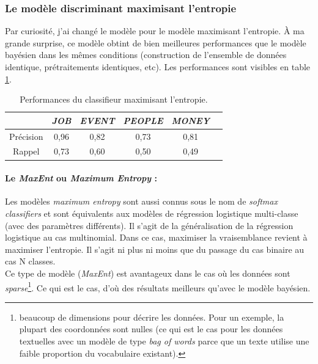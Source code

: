             \subsubsection{Le modèle discriminant maximisant l'entropie}
                Par curiosité, j'ai changé le modèle pour le modèle maximisant l'entropie. À ma grande surprise, ce modèle obtint de bien meilleures performances que le modèle bayésien dans les mêmes conditions (construction de l'ensemble de données identique, prétraitements identiques, etc). Les performances sont visibles en table \ref{tab:classif_perf3}.
                \begin{table}[h]
                    \centering
                    \begin{tabular}{| c | c | c | c | c | c |}
                        \hline
                         & \textit{JOB} & \textit{EVENT} & \textit{PEOPLE} & \textit{MONEY} \\
                        \hline
                        Précision & 0,96 & 0,82 & 0,73 & 0,81 \\
                        Rappel & 0,73 & 0,60 & 0,50 & 0,49 \\
                        \hline
                    \end{tabular}
                    \caption{Performances du classifieur maximisant l'entropie.}
                    \label{tab:classif_perf3}
                \end{table}

                \paragraph{Le \textit{MaxEnt} ou \textit{Maximum Entropy} :}
                    Les modèles \textit{maximum entropy} sont aussi connus sous le nom de \textit{softmax classifiers} et sont équivalents aux modèles de régression logistique multi-classe (avec des paramètres différents). Il s'agit de la généralisation de la régression logistique au cas multinomial. Dans ce cas, maximiser la vraisemblance revient à maximiser l'entropie. Il s'agit ni plus ni moins que du passage du cas binaire au cas N classes.\\
                    Ce type de modèle  (\textit{MaxEnt}) est avantageux dans le cas où les données sont \textit{sparse}\footnote{beaucoup de dimensions pour décrire les données. Pour un exemple, la plupart des coordonnées sont nulles (ce qui est le cas pour les données textuelles avec un modèle de type \textit{bag of words} parce que un texte utilise une faible proportion du vocabulaire existant).}. Ce qui est le cas, d'où des résultats meilleurs qu'avec le modèle bayésien.


